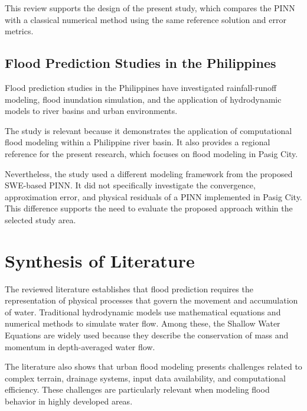 This review supports the design of the present study, which compares the PINN with a classical numerical method using the same reference solution and error metrics.

\subsection{Flood Prediction Studies in the Philippines}

Flood prediction studies in the Philippines have investigated rainfall-runoff modeling, flood inundation simulation, and the application of hydrodynamic models to river basins and urban environments.

The study is relevant because it demonstrates the application of computational flood modeling within a Philippine river basin. It also provides a regional reference for the present research, which focuses on flood modeling in Pasig City.

Nevertheless, the study used a different modeling framework from the proposed SWE-based PINN. It did not specifically investigate the convergence, approximation error, and physical residuals of a PINN implemented in Pasig City. This difference supports the need to evaluate the proposed approach within the selected study area.
\section{Synthesis of Literature}


The reviewed literature establishes that flood prediction requires the representation of physical processes that govern the movement and accumulation of water. Traditional hydrodynamic models use mathematical equations and numerical methods to simulate water flow. Among these, the Shallow Water Equations are widely used because they describe the conservation of mass and momentum in depth-averaged water flow.

The literature also shows that urban flood modeling presents challenges related to complex terrain, drainage systems, input data availability, and computational efficiency. These challenges are particularly relevant when modeling flood behavior in highly developed areas.

